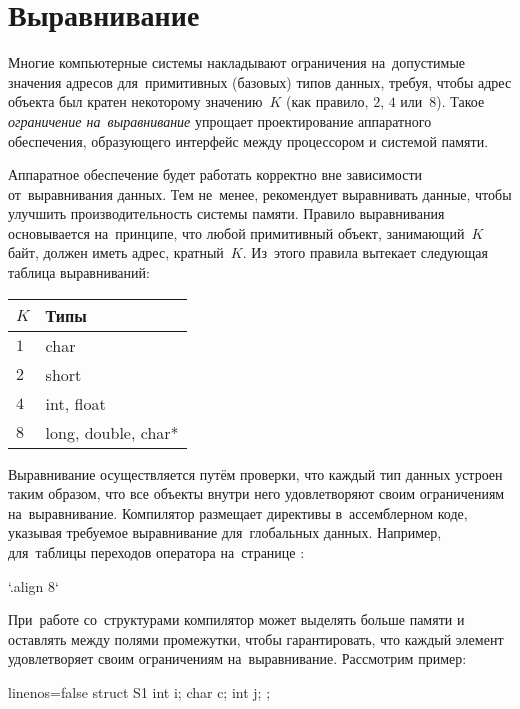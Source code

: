 \section{Выравнивание}
Многие компьютерные системы накладывают ограничения на~допустимые значения адресов для~примитивных (базовых) типов данных, требуя, чтобы адрес объекта был кратен некоторому значению~\(K\) (как правило, \(2\), \(4\) или~\(8\)). Такое \emph{ограничение на~выравнивание} упрощает проектирование аппаратного обеспечения, образующего интерфейс между процессором и системой памяти.

Аппаратное обеспечение  будет работать корректно вне зависимости от~выравнивания данных. Тем не~менее,  рекомендует выравнивать данные, чтобы улучшить производительность системы памяти. Правило выравнивания основывается на~принципе, что любой примитивный объект, занимающий~\(K\) байт, должен иметь адрес, кратный~\(K\). Из~этого правила вытекает следующая таблица выравниваний:

\begin{flushleft}\small\begin{tabular}{l>{\ttfamily}l}
  \(K\) & \textrm{Типы} \\
\midrule
  \(1\) & char \\
  \(2\) & short \\
  \(4\) & int, float \\
  \(8\) & long, double, char* \\
\end{tabular}\end{flushleft}

Выравнивание осуществляется путём проверки, что каждый тип данных устроен таким образом, что все объекты внутри него удовлетворяют своим ограничениям на~выравнивание. Компилятор размещает директивы в~ассемблерном коде, указывая требуемое выравнивание для~глобальных данных. Например, для~таблицы переходов оператора  на~странице \pageref{ex:jumptable}:

\gas`.align 8`

При~работе со~структурами компилятор может выделять больше памяти и оставлять между полями промежутки, чтобы гарантировать, что каждый элемент удовлетворяет своим ограничениям на~выравнивание. Рассмотрим пример:

\begin{ccode*}{linenos=false}
struct S1
{
  int i;
  char c;
  int j;
};
\end{ccode*}


